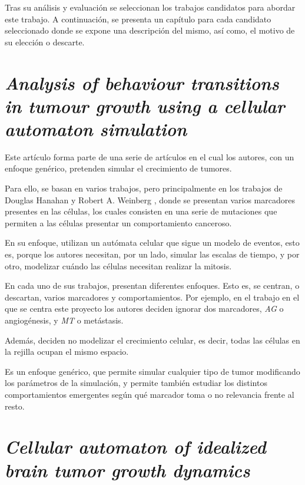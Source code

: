 Tras su análisis y evaluación se seleccionan los trabajos candidatos para abordar
este trabajo. A continuación, se presenta un capítulo para cada candidato seleccionado donde se
expone una descripción del mismo, así como, el motivo de su elección o descarte.

\section{\textit{Analysis of behaviour transitions in tumour growth
using a cellular automaton simulation}}

Este artículo \cite{jsantos-amonteagudo-1-2014} forma parte de una serie de artículos
\cite{jsantos-amonteagudo-2012} \cite{jsantos-amonteagudo-2013} \cite{jsantos-amonteagudo-2015}
en el cual los autores, con un enfoque genérico, pretenden simular el crecimiento de
tumores.

Para ello, se basan en varios trabajos, pero principalmente en los trabajos de Douglas Hanahan y Robert A. Weinberg
\cite{hanahan-weinberg-2000} \cite{hanahan-weinberg-2011}, donde se presentan varios marcadores presentes
en las células, los cuales consisten en una serie de mutaciones que permiten a las células presentar
un comportamiento canceroso.

En su enfoque, utilizan un autómata celular que sigue un modelo de eventos, esto es, porque los autores
necesitan, por un lado, simular las escalas de tiempo, y por otro, modelizar cuándo las células necesitan
realizar la mitosis.

En cada uno de sus trabajos, presentan diferentes enfoques. Esto es, se centran, o descartan, varios marcadores y
comportamientos. Por ejemplo, en el trabajo en el que se centra este proyecto \cite{jsantos-amonteagudo-1-2014}
los autores deciden ignorar dos marcadores, \textit{AG} o angiogénesis, y \textit{MT} o metástasis.

Además, deciden no modelizar el crecimiento celular, es decir, todas las células en la rejilla ocupan
el mismo espacio.

Es un enfoque genérico, que permite simular cualquier tipo de tumor modificando los parámetros de la
simulación, y permite también estudiar los distintos comportamientos emergentes según
qué marcador toma o no relevancia frente al resto.

\section{\textit{Cellular automaton of idealized brain tumor growth dynamics}}

